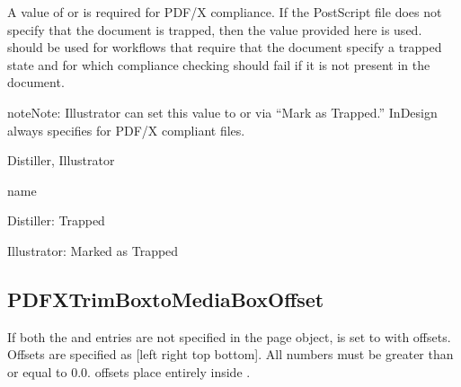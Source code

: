 \documentclass[letterpaper,12pt,english,openany,oneside]{sphinxmanual}
\begin{document}
A value of  or  is required for PDF/X compliance. If the PostScript file does not specify that the document is trapped, then the value provided here is used.  should be used for workflows that require that the document specify a trapped state and for which compliance checking should fail if it is not present in the document.

\begin{sphinxadmonition}{note}{Note:}
Illustrator can set this value to  or  via “Mark as Trapped.” InDesign always specifies  for PDF/X compliant files.
\end{sphinxadmonition}
\label{\detokenize{PDF_Create_CommonSettings:supported-by-119}}

Distiller, Illustrator

\label{\detokenize{PDF_Create_CommonSettings:type-118}}

name

\label{\detokenize{PDF_Create_CommonSettings:ui-name-100}}

Distiller: Trapped

Illustrator: Marked as Trapped

\label{\detokenize{PDF_Create_CommonSettings:default-value-113}}

\begin{sphinxVerbatim}[commandchars=\\\{\}]
\end{sphinxVerbatim}


\subsection{PDFXTrimBoxtoMediaBoxOffset}
\label{\detokenize{PDF_Create_CommonSettings:pdfxtrimboxtomediaboxoffset}}
If both the  and  entries are not specified in the page object,  is set to  with offsets. Offsets are specified as {[}left right top bottom{]}. All numbers must be greater than or equal to 0.0.  offsets place  entirely inside  .
\end{document}
